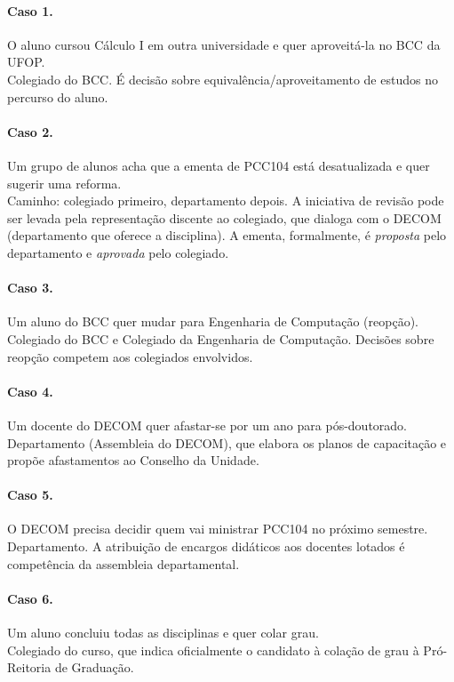 \documentclass[10pt,a4paper]{extarticle}
\newcommand{\impt}[1]{\textcolor{important}{#1}}
\begin{document}
\paragraph{Caso 1.} O aluno cursou Cálculo I em outra universidade e quer aproveitá-la no BCC da UFOP.\\
\impt{Colegiado do BCC.} É decisão sobre equivalência/aproveitamento de estudos no percurso do aluno.

\paragraph{Caso 2.} Um grupo de alunos acha que a ementa de PCC104 está desatualizada e quer sugerir uma reforma.\\
\impt{Caminho: colegiado primeiro, departamento depois.} A iniciativa de revisão pode ser levada pela representação discente ao colegiado, que dialoga com o DECOM (departamento que oferece a disciplina). A ementa, formalmente, é \emph{proposta} pelo departamento e \emph{aprovada} pelo colegiado.

\paragraph{Caso 3.} Um aluno do BCC quer mudar para Engenharia de Computação (reopção).\\
\impt{Colegiado do BCC e Colegiado da Engenharia de Computação.} Decisões sobre reopção competem aos colegiados envolvidos.

\paragraph{Caso 4.} Um docente do DECOM quer afastar-se por um ano para pós-doutorado.\\
\impt{Departamento (Assembleia do DECOM)}, que elabora os planos de capacitação e propõe afastamentos ao Conselho da Unidade.

\paragraph{Caso 5.} O DECOM precisa decidir quem vai ministrar PCC104 no próximo semestre.\\
\impt{Departamento.} A atribuição de encargos didáticos aos docentes lotados é competência da assembleia departamental.

\paragraph{Caso 6.} Um aluno concluiu todas as disciplinas e quer colar grau.\\
\impt{Colegiado do curso}, que indica oficialmente o candidato à colação de grau à Pró-Reitoria de Graduação.
\end{document}
